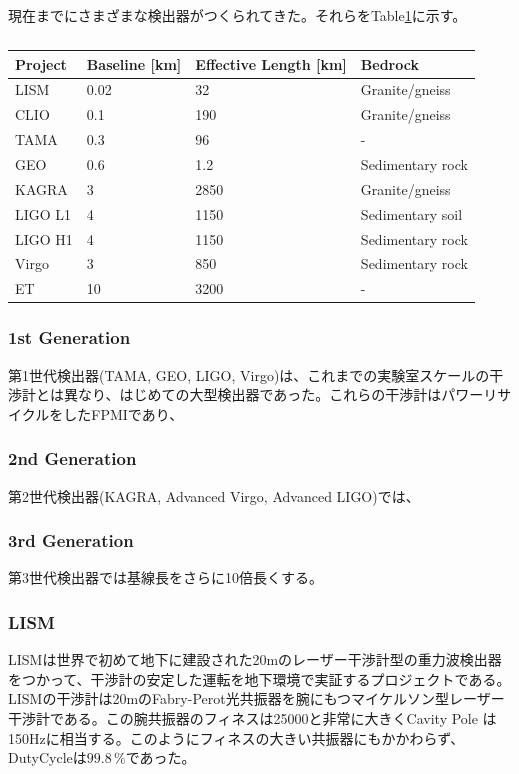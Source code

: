 現在までにさまざまな検出器がつくられてきた。それらをTable\ref{tb:tb101}に示す\cite{chen2017brief}。
\begin{table}[h] 
  \begin{center}
    \caption{\cite{chen2017brief,beker2013low}}\label{tb:tb101}
    \begin{tabular}{llll} 
      \hline
      Project & Baseline [km] & Effective Length [km] & Bedrock \\ \hline \hline
      LISM  & 0.02    & 32  & Granite/gneiss \\
      CLIO  & 0.1   & 190 & Granite/gneiss \\
      TAMA  & 0.3   & 96  & - \\ 
      GEO   & 0.6   & 1.2 & Sedimentary rock \\
      KAGRA   & 3  & 2850  & Granite/gneiss \\
      LIGO L1 & 4  & 1150  & Sedimentary soil \\
      LIGO H1 & 4  & 1150  & Sedimentary rock \\
      Virgo   & 3  & 850   & Sedimentary rock \\
      ET      & 10 & 3200  & - \\
      \hline
    \end{tabular}
  \end{center}
\end{table}


\subsubsection{1st Generation}
第1世代検出器(TAMA\cite{ando2001stable}, GEO\cite{grote2010geo}, LIGO\cite{abbott2009ligo}, Virgo\cite{accadia2012virgo})は、これまでの実験室スケールの干渉計とは異なり、はじめての大型検出器であった。これらの干渉計はパワーリサイクルをしたFPMIであり、

\subsubsection{2nd Generation}
第2世代検出器(KAGRA\cite{akutsu2018kagra}, Advanced Virgo\cite{acernese2014advanced}, Advanced LIGO\cite{aasi2015advanced})では、

\subsubsection{3rd Generation}
第3世代検出器では基線長をさらに10倍長くする。

\subsubsection{LISM}
LISMは世界で初めて地下に建設された20mのレーザー干渉計型の重力波検出器をつかって、干渉計の安定した運転を地下環境で実証するプロジェクトである。LISMの干渉計は20mのFabry-Perot光共振器を腕にもつマイケルソン型レーザー干渉計である。この腕共振器のフィネスは25000と非常に大きくCavity Pole は150Hzに相当する。このようにフィネスの大きい共振器にもかかわらず、DutyCycleは$99.8\,\%$であった。

